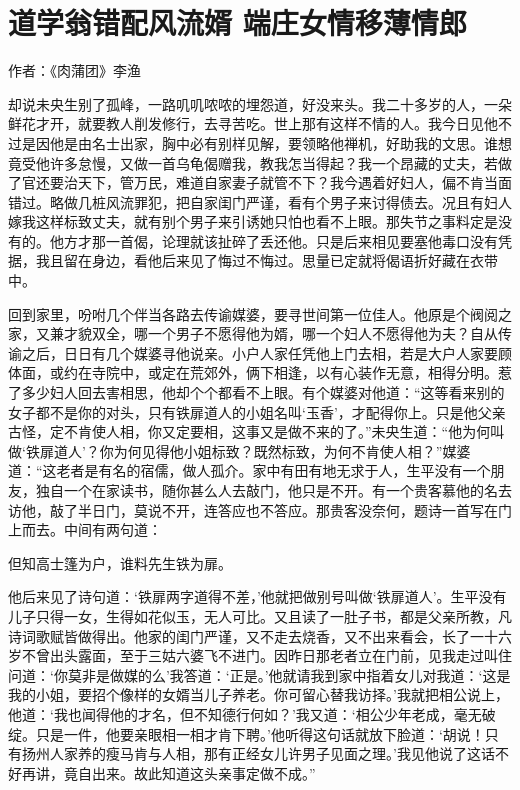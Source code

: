 \documentclass[a4paper,12pt,UTF8,twoside]{ctexbook}
\begin{document}
\chapter{道学翁错配风流婿 端庄女情移薄情郎}

作者：《肉蒲团》李渔

却说未央生别了孤峰，一路叽叽哝哝的埋怨道，好没来头。我二十多岁的人，一朵鲜花才开，就要教人削发修行，去寻苦吃。世上那有这样不情的人。我今日见他不过是因他是由名士出家，胸中必有别样见解，要领略他禅机，好助我的文思。谁想竟受他许多怠慢，又做一首乌龟偈赠我，教我怎当得起？我一个昂藏的丈夫，若做了官还要治天下，管万民，难道自家妻子就管不下？我今遇着好妇人，偏不肯当面错过。略做几桩风流罪犯，把自家闺门严谨，看有个男子来讨得债去。况且有妇人嫁我这样标致丈夫，就有别个男子来引诱她只怕也看不上眼。那失节之事料定是没有的。他方才那一首偈，论理就该扯碎了丢还他。只是后来相见要塞他毒口没有凭据，我且留在身边，看他后来见了悔过不悔过。思量已定就将偈语折好藏在衣带中。

回到家里，吩咐几个伴当各路去传谕媒婆，要寻世间第一位佳人。他原是个阀阅之家，又兼才貌双全，哪一个男子不愿得他为婿，哪一个妇人不愿得他为夫？自从传谕之后，日日有几个媒婆寻他说亲。小户人家任凭他上门去相，若是大户人家要顾体面，或约在寺院中，或定在荒郊外，俩下相逢，以有心装作无意，相得分明。惹了多少妇人回去害相思，他却个个都看不上眼。有个媒婆对他道：“这等看来别的女子都不是你的对头，只有铁扉道人的小姐名叫‘玉香’，才配得你上。只是他父亲古怪，定不肯使人相，你又定要相，这事又是做不来的了。”未央生道：“他为何叫做‘铁扉道人’？你为何见得他小姐标致？既然标致，为何不肯使人相？”媒婆道：“这老者是有名的宿儒，做人孤介。家中有田有地无求于人，生平没有一个朋友，独自一个在家读书，随你甚么人去敲门，他只是不开。有一个贵客慕他的名去访他，敲了半日门，莫说不开，连答应也不答应。那贵客没奈何，题诗一首写在门上而去。中间有两句道：

但知高士篷为户，谁料先生铁为扉。

他后来见了诗句道：‘铁扉两字道得不差，’他就把做别号叫做‘铁扉道人’。生平没有儿子只得一女，生得如花似玉，无人可比。又且读了一肚子书，都是父亲所教，凡诗词歌赋皆做得出。他家的闺门严谨，又不走去烧香，又不出来看会，长了一十六岁不曾出头露面，至于三姑六婆飞不进门。因昨日那老者立在门前，见我走过叫住问道：‘你莫非是做媒的么’我答道：‘正是。’他就请我到家中指着女儿对我道：‘这是我的小姐，要招个像样的女婿当儿子养老。你可留心替我访择。’我就把相公说上，他道：‘我也闻得他的才名，但不知德行何如？’我又道：‘相公少年老成，毫无破绽。只是一件，他要亲眼相一相才肯下聘。’他听得这句话就放下脸道：‘胡说！只有扬州人家养的瘦马肯与人相，那有正经女儿许男子见面之理。’我见他说了这话不好再讲，竟自出来。故此知道这头亲事定做不成。”
\end{document}
